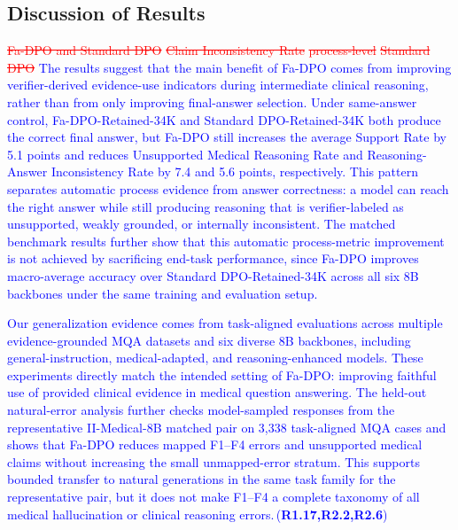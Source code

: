 \documentclass[a4paper,fleqn,doubleblind]{cas-sc}
\DeclareRobustCommand{\deleted}[1]{\textcolor{red}{\sout{#1}}}
\DeclareRobustCommand{\added}[1]{\textcolor{blue}{#1}}
\DeclareRobustCommand{\revtag}[1]{\textcolor{blue}{\scriptsize\,(\textbf{#1})}}
\begin{document}
\subsection{Discussion of Results}
\deleted{Fa-DPO and Standard DPO}
\deleted{Claim Inconsistency Rate}
\deleted{process-level}
\deleted{Standard DPO}
\added{The results suggest that the main benefit of Fa-DPO comes from improving verifier-derived evidence-use indicators during intermediate clinical reasoning, rather than from only improving final-answer selection. Under same-answer control, Fa-DPO-Retained-34K and Standard DPO-Retained-34K both produce the correct final answer, but Fa-DPO still increases the average Support Rate by 5.1 points and reduces Unsupported Medical Reasoning Rate and Reasoning-Answer Inconsistency Rate by 7.4 and 5.6 points, respectively. This pattern separates automatic process evidence from answer correctness: a model can reach the right answer while still producing reasoning that is verifier-labeled as unsupported, weakly grounded, or internally inconsistent. The matched benchmark results further show that this automatic process-metric improvement is not achieved by sacrificing end-task performance, since Fa-DPO improves macro-average accuracy over Standard DPO-Retained-34K across all six 8B backbones under the same training and evaluation setup.}

\added{Our generalization evidence comes from task-aligned evaluations across multiple evidence-grounded MQA datasets and six diverse 8B backbones, including general-instruction, medical-adapted, and reasoning-enhanced models. These experiments directly match the intended setting of Fa-DPO: improving faithful use of provided clinical evidence in medical question answering. The held-out natural-error analysis further checks model-sampled responses from the representative II-Medical-8B matched pair on 3,338 task-aligned MQA cases and shows that Fa-DPO reduces mapped F1--F4 errors and unsupported medical claims without increasing the small unmapped-error stratum. This supports bounded transfer to natural generations in the same task family for the representative pair, but it does not make F1--F4 a complete taxonomy of all medical hallucination or clinical reasoning errors.}\revtag{R1.17,R2.2,R2.6}
\end{document}
